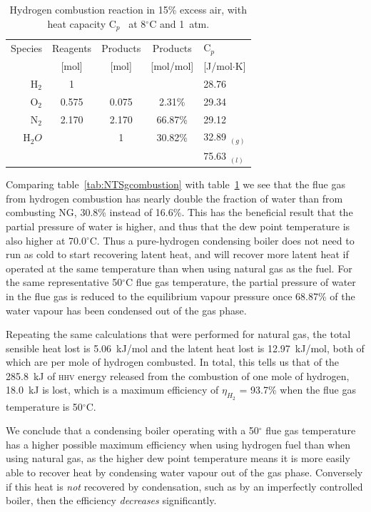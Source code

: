 \documentclass[5p]{elsarticle} %
\begin{document}
\begin{table}[ht]
    \centering
    \caption{Hydrogen combustion reaction in 15\% excess air, with heat capacity C$_p$~\citep{Huber2022} at 8$^\circ$C and 1~atm.}
    \label{tab:hydrogencombustion}
    \begin{tabular}{r|ccc|l}
         Species & Reagents & Products & Products & C$_p$\\
         & {\small[mol]} & {\small[mol]} & {\small[mol/mol]}&  {\small[J/mol$\cdot$K]}\\
         \hline
         H$_2$ & 1 & & & 28.76 \\
         O$_2$ & 0.575 & 0.075 & 2.31\% & 29.34 \\
         N$_2$ & 2.170 & 2.170 & 66.87\% & 29.12 \\
         H$_2O$ & & 1 & 30.82\% & 32.89 $_{(g)}$ \\
         & &  &  & 75.63 $_{(l)}$ \\
    \end{tabular}
\end{table}

Comparing table~\ref{tab:NTSgcombustion} with table~\ref{tab:hydrogencombustion} we see that the flue gas from hydrogen combustion has nearly double the fraction of water than from combusting NG, 30.8\% instead of 16.6\%.
This has the beneficial result that the partial pressure of water is higher, and thus that the dew point temperature is also higher at 70.0$^\circ$C.
Thus a pure-hydrogen condensing boiler does not need to run as cold to start recovering latent heat, and will recover more latent heat if operated at the same temperature than when using natural gas as the fuel. 
For the same representative 50$^\circ$C flue gas temperature, the partial pressure of water in the flue gas is reduced to the equilibrium vapour pressure once 68.87\% of the water vapour has been condensed out of the gas phase. 

Repeating the same calculations that were performed for natural gas, the total sensible heat lost is 5.06~kJ/mol and the latent heat lost is 12.97~kJ/mol, both of which are per mole of hydrogen combusted.
In total, this tells us that of the 285.8~kJ of \textsc{hhv} energy released from the combustion of one mole of hydrogen, 18.0~kJ is lost, which is a maximum efficiency of $\eta_{H_2}$ = 93.7\% when the flue gas temperature is 50$^{\circ}$C.

We conclude that a condensing boiler operating with a 50$^\circ$ flue gas temperature has a higher possible maximum efficiency when using hydrogen fuel than when using natural gas, as the higher dew point temperature means it is more easily able to recover heat by condensing water vapour out of the gas phase.
Conversely
if this heat is \emph{not} recovered by condensation, such as by an imperfectly controlled boiler, then the efficiency \emph{decreases} significantly.
\end{document}
